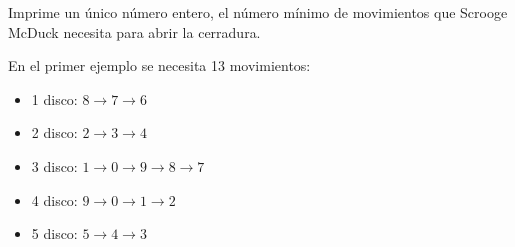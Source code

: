 \outputText

Imprime un único número entero, el número mínimo de movimientos que Scrooge McDuck necesita para abrir la cerradura.

\exampleCases

\begin{example}
\end{example}

\explanationText

En el primer ejemplo se necesita 13 movimientos:
\begin{itemize}
    \item 1 disco: $8 \longrightarrow 7 \longrightarrow 6$
    \item 2 disco: $2 \longrightarrow 3 \longrightarrow 4$
    \item 3 disco: $1 \longrightarrow 0 \longrightarrow 9 \longrightarrow 8 \longrightarrow 7$
    \item 4 disco: $9 \longrightarrow 0 \longrightarrow 1 \longrightarrow 2$
    \item 5 disco: $5 \longrightarrow 4 \longrightarrow 3$
\end{itemize}
